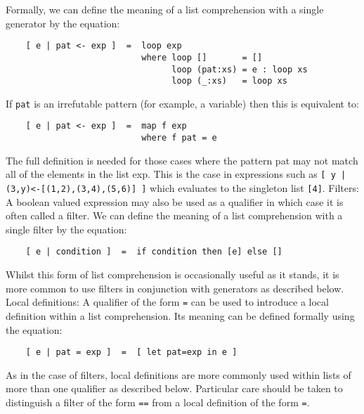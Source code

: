      Formally, we can define the meaning of a list comprehension with a
     single generator by the equation:
\begin{verbatim}
    [ e | pat <- exp ]  =  loop exp
                           where loop []       = []
                                 loop (pat:xs) = e : loop xs
                                 loop (_:xs)   = loop xs
\end{verbatim}
     If \verb"pat" is an irrefutable pattern (for example,  a  variable)  then
     this is equivalent to:
\begin{verbatim}
    [ e | pat <- exp ]  =  map f exp
                           where f pat = e
\end{verbatim}
     The full definition is needed for those cases  where  the  pattern
     pat may not match all of the elements in the list  exp.   This  is
     the case in expressions such as \verb"[ y | (3,y)<-[(1,2),(3,4),(5,6)] ]"
     which evaluates to the singleton list \verb"[4]".
\IT  Filters: A boolean  valued  expression  may  also  be  used  as  a
     qualifier in which case it is  often  called  a  filter.   We  can
     define the meaning of a list comprehension with a single filter by
     the equation:
\begin{verbatim}
    [ e | condition ]  =  if condition then [e] else []
\end{verbatim}
     Whilst this form of list comprehension is occasionally  useful  as
     it stands, it is more common to use filters  in  conjunction  with
     generators as described below.
\IT  Local definitions: A qualifier of the form  \verb"=" 
     can be used to
     introduce a local definition within  a  list  comprehension.   Its
     meaning can be defined formally using the equation:
\begin{verbatim}
    [ e | pat = exp ]  =  [ let pat=exp in e ]
\end{verbatim}
     As in the case of filters, local  definitions  are  more  commonly
     used within lists of more than one qualifier as  described  below.
     Particular care should be taken to distinguish  a  filter  of  the
     form \verb"==" 
     from a local definition of the form \verb"=".

